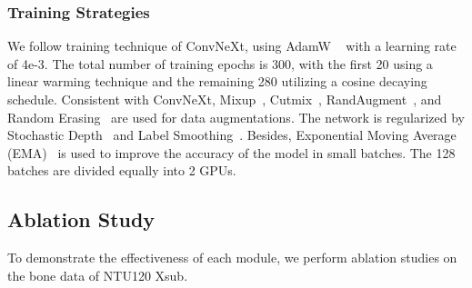 \documentclass[10pt,twocolumn,letterpaper]{article}
\begin{document}
\subsubsection{Training Strategies}
We follow training technique of ConvNeXt, using AdamW ~\cite{Loshchilov2019} with a learning rate of 4e-3. The total number of training epochs is 300, with the first 20 using a linear warming technique and the remaining 280 utilizing a cosine decaying schedule. Consistent with ConvNeXt, Mixup~\cite{Zhang2018a}, Cutmix~\cite{Yun2019}, RandAugment~\cite{Cubuk2020}, and Random Erasing~\cite{Zhong2020} are used for data augmentations. The network is regularized by Stochastic Depth~\cite{Huang2016deep} and Label Smoothing~\cite{Szegedy2016a}. Besides, Exponential Moving Average (EMA)~\cite{Polyak1992} is used to improve the accuracy of the model in small batches. The 128 batches are divided equally into 2 GPUs. \subsection{Ablation Study}
To demonstrate the effectiveness of each module, we perform ablation studies on the bone data of NTU120 Xsub.
\end{document}
